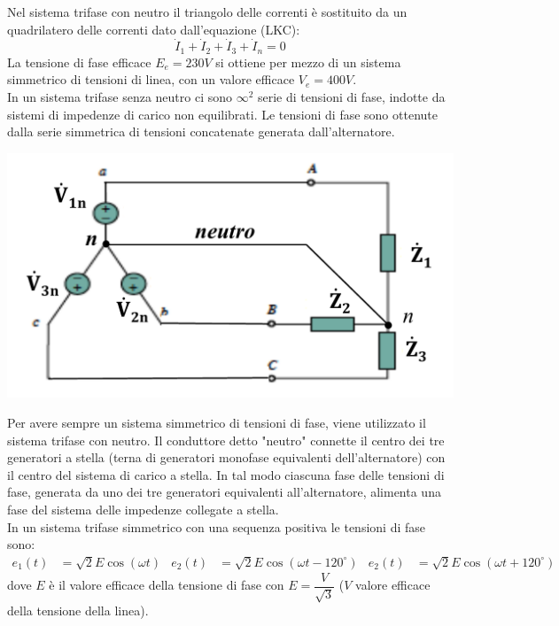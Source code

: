 \documentclass{article}
\begin{document}
Nel sistema trifase con neutro il triangolo
delle correnti è sostituito da un quadrilatero
delle correnti dato dall'equazione (LKC):
\[\dot I_1 + \dot I_2 + \dot I_3 + \dot I_n =0\]
La tensione di fase efficace $E_e = 230 V$ si ottiene per mezzo di un sistema simmetrico di tensioni di linea, con un valore efficace $V_e = 400 V$.
\vspace*{0.2cm}\\
In un sistema trifase senza neutro ci
sono $\infty^2$ serie di tensioni di fase, indotte da sistemi di impedenze di carico non
equilibrati. Le tensioni di fase sono ottenute dalla serie simmetrica di tensioni
concatenate generata dall'alternatore.
\begin{center}
    \includegraphics[scale=0.27]{Image/Sistemi_trifase_neutro_2.png}
\end{center}
Per avere sempre un sistema simmetrico di tensioni di fase, viene utilizzato il sistema trifase con neutro. Il conduttore detto "neutro" connette il centro dei tre generatori a stella (terna di generatori monofase equivalenti dell'alternatore) con il centro
del sistema di carico a stella. In tal modo ciascuna fase delle tensioni di fase, generata da uno dei tre generatori equivalenti all'alternatore, alimenta una fase del sistema delle impedenze collegate a stella.
\vspace*{0.2cm}\\
In un sistema trifase simmetrico con una sequenza positiva le tensioni di fase sono:
\begin{align*}
    e_1(t) &= \sqrt{2} E \cos(\omega t) 
    &
    e_2(t) &= \sqrt{2} E \cos(\omega t - 120^{\circ})
    &
    e_2(t) &= \sqrt{2} E \cos(\omega t + 120^{\circ})
\end{align*}
dove $E$ è il valore efficace della tensione di fase con $E = \dfrac{V}{\sqrt{3}}$ ($V$ valore efficace della tensione della linea).
\end{document}
